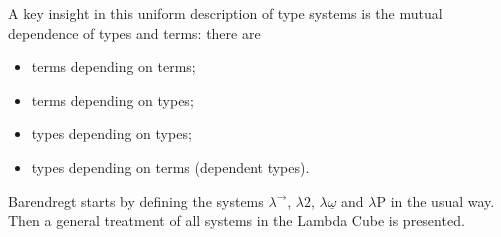 \documentclass[12pt,toc=bibliography,numbers=noendperiod,
               footnotes=multiple,twoside]{scrartcl}
\begin{document}
A key insight in this uniform description of type systems is the mutual dependence of types and terms: there are

\begin{itemize}
\item terms depending on terms;
\item terms depending on types;
\item types depending on types;
\item types depending on terms (dependent types).
\end{itemize}

Barendregt starts by defining the systems \(\lambda^{\rightarrow}\), \(\lambda\textrm{2}\), \(\lambda\underline{\omega}\) and \(\lambda\textrm{P}\) in the usual way. Then a general treatment of all systems in the Lambda Cube is presented.
\end{document}
